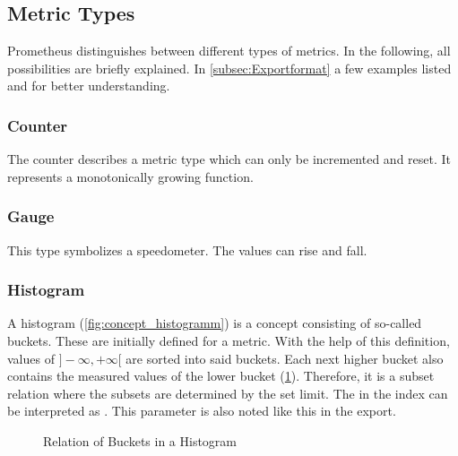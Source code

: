 \subsection{Metric Types}

Prometheus distinguishes between different types of metrics. In the following, all possibilities are briefly explained. In \cref{subsec:Exportformat} a few examples listed and for better understanding.

\subsubsection{Counter}

The counter describes a metric type which can only be incremented and reset. It represents a monotonically growing function. 

\subsubsection{Gauge}

This type symbolizes a speedometer. The values can rise and fall.

\subsubsection{Histogram}

A histogram (\cref{fig:concept_histogramm}) is a concept consisting of so-called buckets. These are initially defined for a metric. With the help of this definition, values of $]-\infty,+\infty[$ are sorted into said buckets. Each next higher bucket also contains the measured values of the lower bucket (\cref{fig:relations_histogramm}). Therefore, it is a subset relation where the subsets are determined by the set limit. The  in the index can be interpreted as . This parameter is also noted like this in the export.

\begin{figure}[H]
	\centering
	\caption{Relation of Buckets in a Histogram}
	\label{fig:relations_histogramm}
\end{figure}

